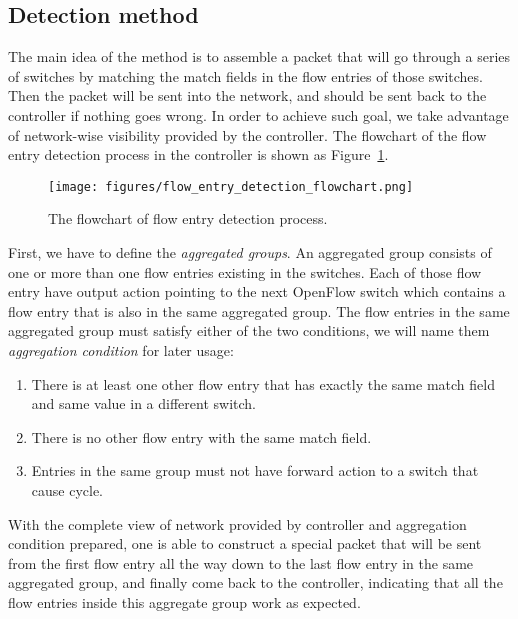 \subsection{Detection method}
\label{Detection_method}
The main idea of the method is to assemble a packet that will go through a series of switches by matching the match fields in the flow entries of those switches. Then the packet will be sent into the network, and should be sent back to the controller if nothing goes wrong. In order to achieve such goal, we take advantage of network-wise visibility provided by the controller. The flowchart of the flow entry detection process in the controller is shown as Figure~\ref{flow_entry_detection_flowchart}. 

\begin{figure}[H]
\begin{center} 
\texttt{[image: figures/flow\_entry\_detection\_flowchart.png]}
\end{center}
\caption{The flowchart of flow entry detection process.}
\label{flow_entry_detection_flowchart}
\end{figure}

First, we have to define the \textit{aggregated groups}. An aggregated group consists of one or more than one flow entries existing in the switches. Each of those flow entry have output action pointing to the next OpenFlow switch which contains a flow entry that is also in the same aggregated group. The flow entries in the same aggregated group must satisfy either of the two conditions, we will name them \textit{aggregation condition} for later usage: 
\begin{enumerate}
\item
There is at least one other flow entry that has exactly the same match field and same value in a different switch.
\item
There is no other flow entry with the same match field.
\item
Entries in the same group must not have forward action to a switch that cause cycle.
\end{enumerate}

With the complete view of network provided by controller and aggregation condition prepared, one is able to construct a special packet that will be sent from the first flow entry all the way down to the last flow entry in the same aggregated group, and finally come back to the controller, indicating that all the flow entries inside this aggregate group work as expected. 

